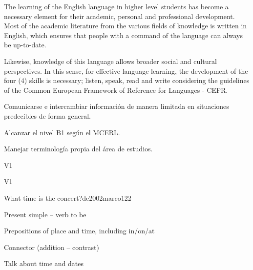 \begin{syllabus}


\begin{justification}
The learning of the English language in higher level students has become a necessary 
element for their academic, personal and professional development.
Most of the academic literature from the various fields of knowledge is written in English, 
which ensures that people with a command of the language can always be up-to-date.

Likewise, knowledge of this language allows broader social and cultural perspectives. 
In this sense, for effective language learning, the development of the four (4) 
skills is necessary; listen, speak, read and write considering the guidelines of the 
Common European Framework of Reference for Languages - CEFR.
\end{justification}

\begin{goals}
\item Comunicarse e intercambiar información de manera limitada en situaciones predecibles de forma general.
\item Alcanzar el nivel B1 según el MCERL.
\item Manejar terminología propia del área de estudios.
\end{goals}

\begin{outcomes}{V1}
    \item {}
\end{outcomes}

\begin{competences}{V1}
    \item {}
\end{competences}

\begin{unit}{What time is the concert?}{}{de2002marco}{12}{2}
   \begin{topics}
      \item Present simple – verb to be
      \item Prepositions of place and time, including in/on/at
      \item Connector (addition – contrast)
   \end{topics}

   \begin{learningoutcomes}
      \item Talk about time and dates
   \end{learningoutcomes}


\end{unit}
\end{syllabus}
